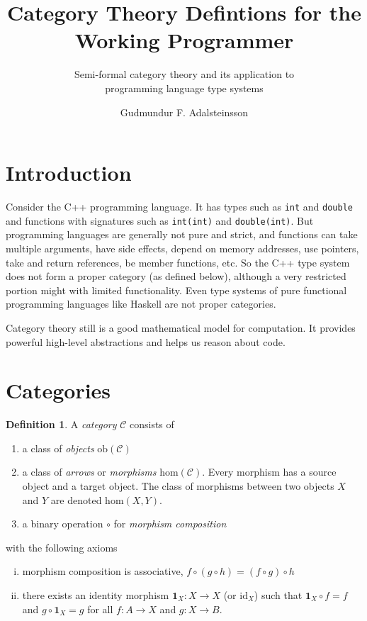 \documentclass[11pt,a4paper]{scrartcl}
\title{Category Theory Defintions for the \\Working Programmer }
\subtitle{Semi-formal category theory and its application to \\programming language type systems}
\author{Gudmundur F. Adalsteinsson}
\newcommand{\idm}[1]{\mathbf{1}_{#1}}
\newcommand{\cdef}[1]{\emph{#1}}
\theoremstyle{plain}
\theoremstyle{definition}
\newtheorem{defn}{Definition}
\theoremstyle{remark}
\begin{document}
\maketitle
{}
\tableofcontents
\clearpage

\section{Introduction}

Consider the C++ programming language. It has types such as \texttt{int} and \texttt{double} and functions with signatures such as \texttt{int(int)} and \texttt{double(int)}. But programming languages are generally not pure and strict, and functions can take multiple arguments, have side effects, depend on memory addresses, use pointers, take and return references, be member functions, etc. So the C++ type system does not form a proper category (as defined below), although a very restricted portion might with limited functionality. Even type systems of pure functional programming languages like Haskell are not proper categories. 

Category theory still is a good mathematical model for computation. It provides powerful high-level abstractions and helps us reason about code.

\section{Categories}

\begin{defn}
A \cdef{category} $\mathcal{C}$ consists of
\begin{enumerate}
	\item a class of \cdef{objects} $\text{ob}(\mathcal{C})$
	\item a class of \cdef{arrows} or \cdef{morphisms} $\text{hom}(\mathcal{C})$. Every morphism has a source object and a target object. The class of morphisms between two objects $X$ and $Y$ are denoted $\text{hom}(X,Y)$.
	\item a binary operation $\circ$ for \cdef{morphism composition}
\end{enumerate}
with the following axioms
\begin{enumerate}[(i)]
	\item morphism composition is associative, $f \circ (g \circ h) = (f \circ g) \circ h$
	\item there exists an identity morphism $\idm{X}\colon X \to X$ (or $\text{id}_X$) such that $\idm{X} \circ f = f$ and $g \circ \idm{X} = g$ for all $f\colon A \to X$ and $g\colon X \to B$.
\end{enumerate}
\end{defn}
\end{document}
